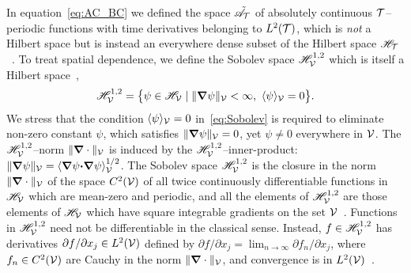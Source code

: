 \documentclass[amsa]{ipart}
\begin{document}
In equation~\eqref{eq:AC_BC} we defined the space $\tilde{\mathscr{A}}_{\mathcal{T}}$ of
absolutely continuous $\mathcal{T}$--periodic functions with time derivatives
belonging to $L^2(\mathcal{T})$, which is \emph{not} a Hilbert space but is
instead an everywhere dense subset of the Hilbert space
$\mathscr{H}_{\mathcal{T}}$~\cite{Stone:64}. To treat spatial dependence, we define 
the Sobolev space $\mathscr{H}^{1,2}_{\mathcal{V}}$ which is itself a Hilbert
space~\cite{Bhattacharya:AAP:1999:951,Folland:95:PDEs,McOwen:2003:PDE},             
% 
\begin{align}\label{eq:Sobolev}
  \Hs^{1,2}_{\Vc}=\big\{\psi\in \Hs_{\Vc} \; | \; \|\bnabla\psi\|_{\Vc}<\infty, \ \langle\psi\rangle_{\Vc}=0\big\}.
\end{align}
%
We stress that the condition $\langle\psi\rangle_{\mathcal{V}}=0$ in~\eqref{eq:Sobolev} is
required to eliminate non-zero constant $\psi$, which satisfies
$\|\mbox{\boldmath${\nabla}$}\psi\|_{\mathcal{V}}=0$, yet $\psi\neq0$ everywhere in $\mathcal{V}$.  
The $\mathscr{H}^{1,2}_{\mathcal{V}}$--norm $\|\mbox{\boldmath${\nabla}$}\cdot\|_{\mathcal{V}}$ is induced by the
$\mathscr{H}^{1,2}_{\mathcal{V}}$--inner-product:
$\|\mbox{\boldmath${\nabla}$}\psi\|_{\mathcal{V}}=\langle\mbox{\boldmath${\nabla}$}\psi\mbox{\boldmath${\cdot}$}\mbox{\boldmath${\nabla}$}\psi\rangle_{\mathcal{V}}^{1/2}$. 
The Sobolev space $\mathscr{H}^{1,2}_{\mathcal{V}}$  is the closure in the norm
$\|\mbox{\boldmath${\nabla}$}\cdot\|_{\mathcal{V}}$ of the space $C^2(\mathcal{V})$ of all twice continuously
differentiable functions in $\mathscr{H}_{\mathcal{V}}$ which are mean-zero and
periodic, and all the elements of $\mathscr{H}^{1,2}_{\mathcal{V}}$ are those elements
of $\mathscr{H}_{\mathcal{V}}$ which have square integrable gradients on the set
$\mathcal{V}$~\cite{Bhattacharya:AAP:1999:951}. Functions in $\mathscr{H}^{1,2}_{\mathcal{V}}$
need not be differentiable in the classical 
sense. Instead, $f\in\mathscr{H}^{1,2}_{\mathcal{V}}$ has derivatives $\partial f/\partial x_j\in
L^2(\mathcal{V})$ defined by $\partial f/\partial x_j=\lim_{n\to\infty}\partial f_n/\partial x_j$, where $f_n\in
C^2(\mathcal{V})$ are Cauchy in the norm $\|\mbox{\boldmath${\nabla}$}\cdot\|_{\mathcal{V}}$, and convergence is
in $L^2(\mathcal{V})$~\cite{McOwen:2003:PDE}. 
\end{document}
